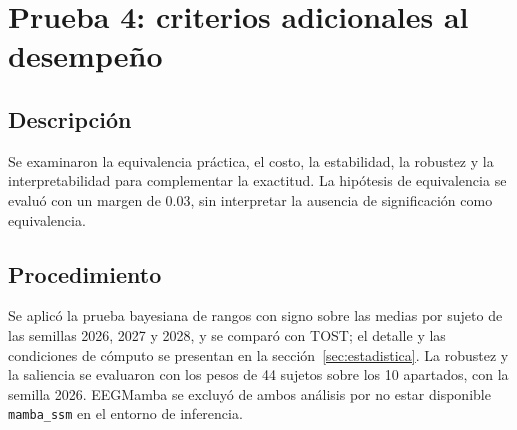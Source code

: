 \section{Prueba 4: criterios adicionales al desempeño}
\subsection{Descripción} Se examinaron la equivalencia práctica, el costo, la estabilidad, la robustez y la interpretabilidad para complementar la exactitud. La hipótesis de equivalencia se evaluó con un margen de 0.03, sin interpretar la ausencia de significación como equivalencia.
\subsection{Procedimiento} Se aplicó la prueba bayesiana de rangos con signo sobre las medias por sujeto de las semillas 2026, 2027 y 2028, y se comparó con TOST; el detalle y las condiciones de cómputo se presentan en la sección~\ref{sec:estadistica}. La robustez y la saliencia se evaluaron con los pesos de 44 sujetos sobre los 10 apartados, con la semilla 2026. EEGMamba se excluyó de ambos análisis por no estar disponible \texttt{mamba\_ssm} en el entorno de inferencia.
